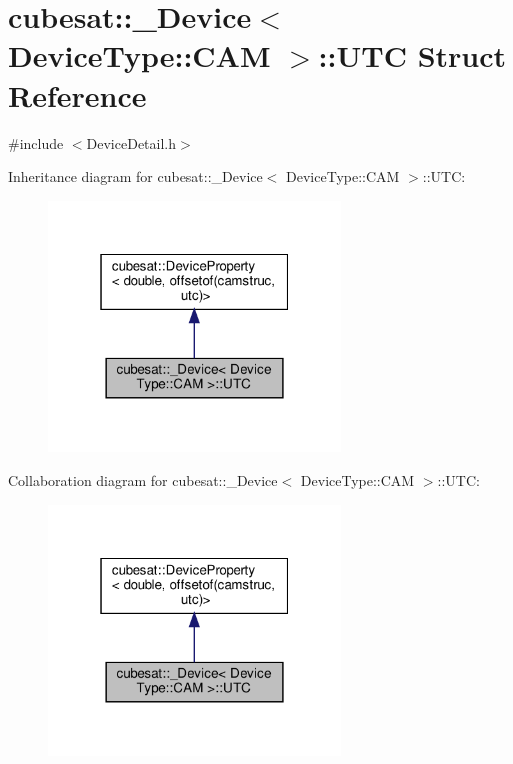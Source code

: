 \hypertarget{structcubesat_1_1__Device_3_01DeviceType_1_1CAM_01_4_1_1UTC}{}\section{cubesat\+:\+:\+\_\+\+Device$<$ Device\+Type\+:\+:C\+AM $>$\+:\+:U\+TC Struct Reference}
\label{structcubesat_1_1__Device_3_01DeviceType_1_1CAM_01_4_1_1UTC}


{\ttfamily \#include $<$Device\+Detail.\+h$>$}



Inheritance diagram for cubesat\+:\+:\+\_\+\+Device$<$ Device\+Type\+:\+:C\+AM $>$\+:\+:U\+TC\+:\nopagebreak
\begin{figure}[H]
\begin{center}
\leavevmode
\includegraphics[width=220pt]{structcubesat_1_1__Device_3_01DeviceType_1_1CAM_01_4_1_1UTC__inherit__graph}
\end{center}
\end{figure}


Collaboration diagram for cubesat\+:\+:\+\_\+\+Device$<$ Device\+Type\+:\+:C\+AM $>$\+:\+:U\+TC\+:\nopagebreak
\begin{figure}[H]
\begin{center}
\leavevmode
\includegraphics[width=220pt]{structcubesat_1_1__Device_3_01DeviceType_1_1CAM_01_4_1_1UTC__coll__graph}
\end{center}
\end{figure}
